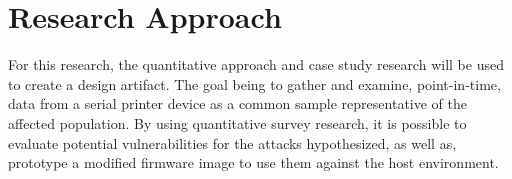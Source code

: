 


\section{Research Approach} \label{researchapproach}

For this research, the quantitative approach and case study research will be used \autocite{babbie2017basics,creswell2017research} to create a design artifact. The goal being to gather and examine, point-in-time, data from a serial printer device as a common sample representative of the affected population. By using quantitative survey research, it is possible to evaluate potential vulnerabilities for the attacks hypothesized, as well as, prototype a modified firmware image to use them against the host environment.





